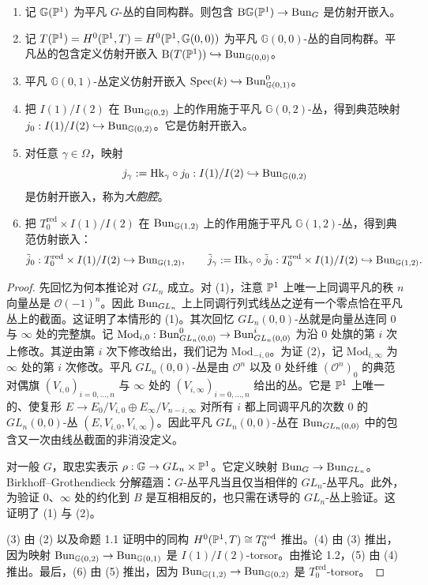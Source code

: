 \begin{corollary}\label{cor:1.3}
\begin{enumerate}[label=(\arabic*), leftmargin=1.8em, itemsep=.2em]
\item 记 $\mathbb{G}(\mathbb{P}^1)$ 为平凡 $G$-丛的自同构群。则包含 $\mathrm B\mathbb{G}(\mathbb{P}^1)\to\mathrm{Bun}_G$ 是仿射开嵌入。
\item 记 $T(\mathbb{P}^1)=H^0(\mathbb{P}^1,T)=H^0(\mathbb{P}^1,\mathbb{G}(0,0))$ 为平凡 $\mathbb{G}(0,0)$-丛的自同构群。平凡丛的包含定义仿射开嵌入 $\mathrm B(T(\mathbb{P}^1))\hookrightarrow\mathrm{Bun}_{\mathbb{G}(0,0)}$。
\item 平凡 $\mathbb{G}(0,1)$-丛定义仿射开嵌入 $\operatorname{Spec}(k)\hookrightarrow\mathrm{Bun}^0_{\mathbb{G}(0,1)}$。
\item 把 $I(1)/I(2)$ 在 $\mathrm{Bun}_{\mathbb{G}(0,2)}$ 上的作用施于平凡 $\mathbb{G}(0,2)$-丛，得到典范映射 $j_0:I(1)/I(2)\hookrightarrow\mathrm{Bun}_{\mathbb{G}(0,2)}$。它是仿射开嵌入。
\item 对任意 $\gamma\in\Omega$，映射
\[
j_\gamma:=\mathrm{Hk}_\gamma\circ j_0:I(1)/I(2)\hookrightarrow\mathrm{Bun}_{\mathbb{G}(0,2)}
\]
是仿射开嵌入，称为\emph{大胞腔}。
\item 把 $T_0^{\mathrm{red}}\times I(1)/I(2)$ 在 $\mathrm{Bun}_{\mathbb{G}(1,2)}$ 上的作用施于平凡 $\mathbb{G}(1,2)$-丛，得到典范仿射嵌入：
\[
\tilde j_0:T_0^{\mathrm{red}}\times I(1)/I(2)\hookrightarrow\mathrm{Bun}_{\mathbb{G}(1,2)},\qquad
\tilde j_\gamma:=\mathrm{Hk}_\gamma\circ\tilde j_0:T_0^{\mathrm{red}}\times I(1)/I(2)\hookrightarrow\mathrm{Bun}_{\mathbb{G}(1,2)}.
\]
\end{enumerate}
\end{corollary}

\begin{proof}
先回忆为何本推论对 $GL_n$ 成立。对 (1)，注意 $\mathbb{P}^1$ 上唯一上同调平凡的秩 $n$ 向量丛是 $\mathcal O(-1)^n$。因此 $\mathrm{Bun}_{GL_n}$ 上上同调行列式线丛之逆有一个零点恰在平凡丛上的截面。这证明了本情形的 (1)。其次回忆 $GL_n(0,0)$-丛就是向量丛连同 $0$ 与 $\infty$ 处的完整旗。记 $\mathrm{Mod}_{i,0}:\mathrm{Bun}^0_{GL_n(0,0)}\to\mathrm{Bun}^i_{GL_n(0,0)}$ 为沿 $0$ 处旗的第 $i$ 次上修改。其逆由第 $i$ 次下修改给出，我们记为 $\mathrm{Mod}_{-i,0}$。为证 (2)，记 $\mathrm{Mod}_{i,\infty}$ 为 $\infty$ 处的第 $i$ 次修改。平凡 $GL_n(0,0)$-丛是由 $\mathcal O^n$ 以及 $0$ 处纤维 $(\mathcal O^n)_0$ 的典范对偶旗 $(V_{i,0})_{i=0,\dots,n}$ 与 $\infty$ 处的 $(V_{i,\infty})_{i=0,\dots,n}$ 给出的丛。它是 $\mathbb{P}^1$ 上唯一的、使复形 $E\to E_0/V_{i,0}\oplus E_\infty/V_{n-i,\infty}$ 对所有 $i$ 都上同调平凡的次数 $0$ 的 $GL_n(0,0)$-丛 $(E,V_{i,0},V_{i,\infty})$。因此平凡 $GL_n(0,0)$-丛在 $\mathrm{Bun}_{GL_n(0,0)}$ 中的包含又一次由线丛截面的非消没定义。

对一般 $G$，取忠实表示 $\rho:\mathbb{G}\to GL_n\times\mathbb{P}^1$。它定义映射 $\mathrm{Bun}_G\to\mathrm{Bun}_{GL_n}$。Birkhoff--Grothendieck 分解蕴涵：$G$-丛平凡当且仅当相伴的 $GL_n$-丛平凡。此外，为验证 $0$、$\infty$ 处的约化到 $B$ 是互相相反的，也只需在诱导的 $GL_n$-丛上验证。这证明了 (1) 与 (2)。

(3) 由 (2) 以及命题 1.1 证明中的同构 $H^0(\mathbb{P}^1,T)\cong T_0^{\mathrm{red}}$ 推出。(4) 由 (3) 推出，因为映射 $\mathrm{Bun}_{\mathbb{G}(0,2)}\to\mathrm{Bun}_{\mathbb{G}(0,1)}$ 是 $I(1)/I(2)$-torsor。由推论 1.2，(5) 由 (4) 推出。最后，(6) 由 (5) 推出，因为 $\mathrm{Bun}_{\mathbb{G}(1,2)}\to\mathrm{Bun}_{\mathbb{G}(0,2)}$ 是 $T_0^{\mathrm{red}}$-torsor。
\end{proof}
